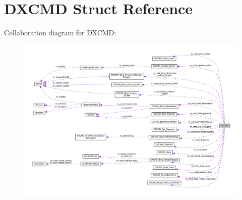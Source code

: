 \hypertarget{structDXCMD}{}\section{D\+X\+C\+MD Struct Reference}
\label{structDXCMD}


Collaboration diagram for D\+X\+C\+MD\+:\nopagebreak
\begin{figure}[H]
\begin{center}
\leavevmode
\includegraphics[width=350pt]{structDXCMD__coll__graph}
\end{center}
\end{figure}
